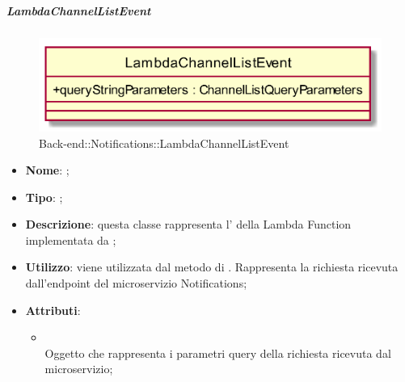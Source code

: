 \hypertarget{LambdaChannelListEvent_label}{\subparagraph{LambdaChannelListEvent}}
\begin{figure}[h]
	\centering
	\includegraphics[width=\textwidth,height=\textheight,keepaspectratio]{images/ClassLambdaChannelListEvent.png}
	\caption{Back-end::Notifications::LambdaChannelListEvent}
\end{figure}
\begin{itemize}
	\item \textbf{Nome}: ;
	\item \textbf{Tipo}: ;
	\item \textbf{Descrizione}: questa classe rappresenta l' della Lambda Function implementata da ;
	\item \textbf{Utilizzo}: viene utilizzata dal metodo  di . Rappresenta la richiesta ricevuta dall'endpoint del microservizio Notifications;
	\item \textbf{Attributi}:
	\begin{itemize}
		\item[]  \\
		Oggetto che rappresenta i parametri query della richiesta ricevuta dal microservizio;
	\end{itemize}
\end{itemize}
\FloatBarrier

